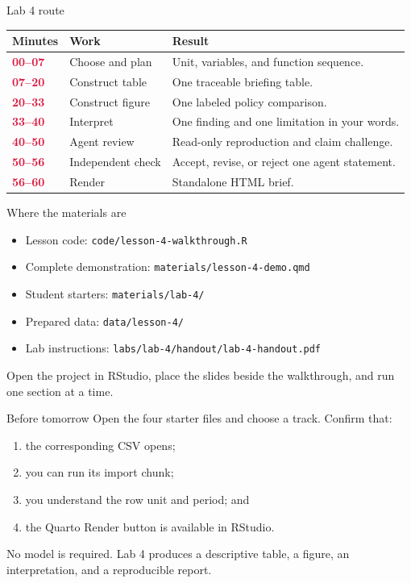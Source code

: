 \begin{frame}{Lab 4 route}
\small
\begingroup
\renewcommand{\arraystretch}{1.18}
\begin{tabularx}{\textwidth}{@{}
  >{\RaggedRight\arraybackslash}p{1.55cm}
  >{\RaggedRight\arraybackslash}p{2.55cm}
  >{\RaggedRight\arraybackslash}X
@{}}
\toprule
\textbf{Minutes} & \textbf{Work} & \textbf{Result} \\
\midrule
\textcolor{crimson}{\textbf{00--07}} & Choose and plan & Unit, variables, and function sequence. \\
\textcolor{crimson}{\textbf{07--20}} & Construct table & One traceable briefing table. \\
\textcolor{crimson}{\textbf{20--33}} & Construct figure & One labeled policy comparison. \\
\textcolor{crimson}{\textbf{33--40}} & Interpret & One finding and one limitation in your words. \\
\textcolor{crimson}{\textbf{40--50}} & Agent review & Read-only reproduction and claim challenge. \\
\textcolor{crimson}{\textbf{50--56}} & Independent check & Accept, revise, or reject one agent statement. \\
\textcolor{crimson}{\textbf{56--60}} & Render & Standalone HTML brief. \\
\bottomrule
\end{tabularx}
\endgroup
\end{frame}

\begin{frame}{Where the materials are}
\begin{itemize}
\item Lesson code: \texttt{code/lesson-4-walkthrough.R}
\item Complete demonstration: \texttt{materials/lesson-4-demo.qmd}
\item Student starters: \texttt{materials/lab-4/}
\item Prepared data: \texttt{data/lesson-4/}
\item Lab instructions: \texttt{labs/lab-4/handout/lab-4-handout.pdf}
\end{itemize}
\vspace{0.35cm}
Open the project in RStudio, place the slides beside the walkthrough, and run one section at a time.
\end{frame}

\begin{frame}{Before tomorrow}
Open the four starter files and choose a track. Confirm that:
\begin{enumerate}
\item the corresponding CSV opens;
\item you can run its import chunk;
\item you understand the row unit and period; and
\item the Quarto Render button is available in RStudio.
\end{enumerate}
\vspace{0.35cm}
No model is required. Lab 4 produces a descriptive table, a figure, an interpretation, and a reproducible report.
\end{frame}
